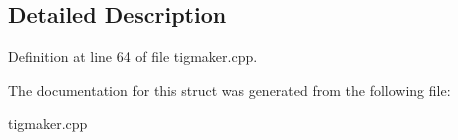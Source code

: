 \subsection{Detailed Description}


Definition at line 64 of file tigmaker.\-cpp.



The documentation for this struct was generated from the following file\-:\begin{DoxyCompactItemize}
\item 
tigmaker.\-cpp\end{DoxyCompactItemize}
